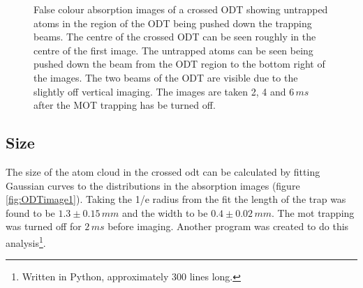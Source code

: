 \begin{figure}[h]
\begin{subfigure}[b]{0.3\textwidth}
    \end{subfigure}\begin{subfigure}[b]{0.3\textwidth}
    \end{subfigure}
\caption{False colour absorption images of a crossed ODT showing untrapped atoms in the region of the ODT being pushed down the trapping beams. The centre of the crossed ODT can be seen roughly in the centre of the first image. The untrapped atoms can be seen being pushed down the beam from the ODT region to the bottom right of the images.  The two beams of the ODT are visible due to the slightly off vertical imaging. The images are taken 2, 4 and $6\,\unit{ms}$ after the MOT trapping has be turned off.}
\label{fig:crossed_effect}
\end{figure}

\subsection{Size}
The size of the atom cloud in the crossed \gls{odt} can be calculated by fitting Gaussian curves to the distributions in the absorption images (figure \ref{fig:ODTimage1}). Taking the 1/e radius from the fit the length of the trap was found to be $1.3\pm0.15\,\unit{mm}$ and the width to be $0.4\pm0.02\,\unit{mm}$. The \gls{mot} trapping was turned off for $2\,\unit{ms}$ before imaging. Another program was created to do this analysis\footnote{Written in Python, approximately 300 lines long.}.

